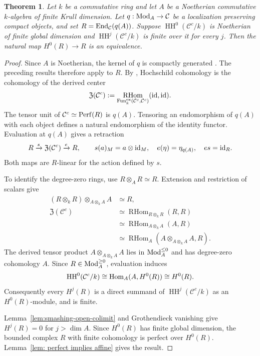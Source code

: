 \documentclass[12pt, letter]{amsart}
\newtheorem{theorem}{Theorem}[section]
\theoremstyle{definition}
\newcommand{\HH}{\operatorname{HH}}
\DeclareMathOperator{\RHom}{RHom}
\numberwithin{equation}{section}
\begin{document}
\begin{theorem}\label{thm:recognition}
Let $k$ be a commutative ring and let $A$ be a Noetherian commutative $k$-algebra
of finite Krull dimension.
Let $q:\operatorname{Mod}_A\to\mathcal C$ be a localization preserving compact
objects, and set $R=\operatorname{End}_{\mathcal C}(q(A))$.
Suppose $\HH^0(\mathcal C^c/k)$ is Noetherian of finite global dimension
and $\HH^j(\mathcal C^c/k)$ is finite over it for every $j$.
Then the natural map $H^0(R)\to R$ is an equivalence.
\end{theorem}
\begin{proof}
Since $A$ is Noetherian, the kernel of $q$ is compactly generated
\cite[Corollary~3.4]{Neeman}.
The preceding results therefore apply to $R$.
By \cite[Corollaries~8.1--8.2]{Toen}, Hochschild cohomology is the
cohomology of the derived center
\[
 \mathfrak Z(\mathcal C^c)
 :=\RHom_{\operatorname{Fun}^{\mathrm{ex}}_k(\mathcal C^c,\mathcal C^c)}
           (\id,\id).
\]
The tensor unit of $\mathcal C^c\simeq\mathrm{Perf}(R)$ is $q(A)$.
Tensoring an endomorphism of $q(A)$ with each object defines
a natural endomorphism of the identity functor.
Evaluation at $q(A)$ gives a retraction
\[
 R\xrightarrow{s}\mathfrak Z(\mathcal C^c)
   \xrightarrow{e}R,\qquad
 s(a)_M=a\otimes\mathrm{id}_M,\quad e(\eta)=\eta_{q(A)},\quad es=\mathrm{id}_R.
\]
Both maps are $R$-linear for the action defined by $s$.

To identify the degree-zero rings, use $R\otimes_A R\simeq R$.
Extension and restriction of scalars give
\[
 \begin{aligned}
 (R\otimes_k R)\otimes_{A\otimes_k A}A&\simeq R,\\
 \mathfrak Z(\mathcal C^c)
 &\simeq\RHom_{R\otimes_k R}(R,R)\\
 &\simeq\RHom_{A\otimes_k A}(A,R)\\
 &\simeq\RHom_A(A\otimes_{A\otimes_k A}A,R).
 \end{aligned}
\]
The derived tensor product $A\otimes_{A\otimes_k A}A$ lies in
$\operatorname{Mod}_A^{\le0}$ and has degree-zero cohomology $A$.
Since $R\in\operatorname{Mod}_A^{\ge0}$, evaluation induces
\[
 \HH^0(\mathcal C^c/k)
 \cong\Hom_A(A,H^0(R))\cong H^0(R).
\]
Consequently every $H^j(R)$ is a direct summand of
$\HH^j(\mathcal C^c/k)$ as an $H^0(R)$-module, and is finite.

Lemma~\ref{lem:smashing-open-colimit} and Grothendieck vanishing give $H^j(R)=0$ for $j>\dim A$.
Since $H^0(R)$ has finite global dimension, the bounded complex $R$
with finite cohomology is perfect over $H^0(R)$.
Lemma~\ref{lem: perfect implies affine} gives the result.
\end{proof}
\end{document}
